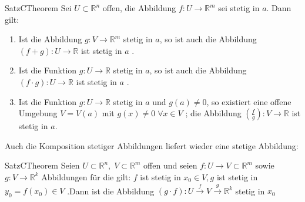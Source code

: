 \documentclass[11.5 pt, a4paper]{memoir}
\begin{document}
\begin{ibox}[18]{Satz}{CTheorem}
	Sei $ U \subset \mathbb{R}^n  $ offen, die Abbildung $ f : U \to \mathbb{R}^m $ sei stetig in $ a $. Dann gilt:
	\begin{enumerate}[label=\alph*)]
		\item Ist die Abbildung $ g: V \to \mathbb{R}^m $ stetig in $ a $, so ist auch die Abbildung
			$ (f+g):U \to \mathbb{R}  $ ist stetig in $ a $ .
 		\item Ist die Funktion $ g: U \to \mathbb{R}  $ stetig in $ a $, so ist auch die Abbildung
			 $ (f \cdot g) : U \to \mathbb{R}  $ ist stetig in $ a $ .
		\item Ist die Funktion $ g: U \to \mathbb{R}  $ stetig in $ a  $ und  $ g(a) \neq 0 $, so existiert eine offene Umgebung 
			$ V = V(a) $ mit $ g(x) \neq 0 \; \forall x \in V $ ; die Abbildung 
			$ \left( \frac{f}{g}\right) : V \to \mathbb{R}    $ ist stetig in $ a $.  
	\end{enumerate}
\end{ibox}

Auch die Komposition stetiger Abbildungen liefert wieder eine stetige Abbildung:

\begin{ibox}[19]{Satz}{CTheorem}
    Seien $ U \subset \mathbb{R}^n , \; V \subset \mathbb{R}^m $ offen und seien $ f: U \to V \subset \mathbb{R}^m $ sowie
	$ g: V \to \mathbb{R}^k $ Abbildungen für die gilt: $ f $ ist stetig in $ x_0 \in V, g  $ ist stetig in $ y_0 = f \left( x_0 \right) 
	\in V$ .Dann ist die Abbildung $ \left( g \cdot f \right) : U \xrightarrow{f} V \xrightarrow{g} \mathbb{R}^k  $ stetig in $ x_0 $  
\end{ibox}
\end{document}
